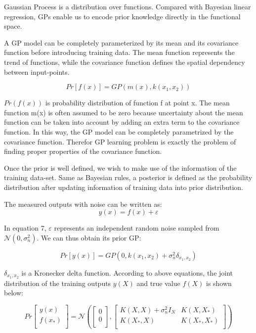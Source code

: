 \documentclass[conference]{IEEEtran}
\begin{document}
Gaussian Process is a distribution over functions. Compared with Bayesian linear regression, GPs enable us to encode prior knowledge directly in the functional space.

A GP model can be completely parameterized by its mean and its covariance function before introducing training data. The mean function represents the trend of functions, while the covariance function defines the spatial dependency between input-points\cite{duvenaud2014automatic}\cite{wilson2014covariance}.

\begin{equation}
  Pr[f(x)] = GP(m(x),k(x_1,x_2))  
\end{equation}

$Pr(f(x))$ is probability distribution of function f at point x. The mean function m(x) is often assumed to be zero because uncertainty about the mean function can be taken into account by adding an extra term to the covariance function. In this way, the GP model can be completely parametrized by the covariance function. Therefor GP learning problem is exactly the problem of finding proper properties of the covariance function.

Once the prior is well defined, we wish to make use of the information of the training data-set. Same as Bayesian rules, a posterior is defined as the probability distribution after updating information of training data into prior distribution.

The measured outputs with noise can be written as:
\begin{equation}
  y(x) = f (x) + \varepsilon
\end{equation}

In equation 7, $\varepsilon$ represents an independent random noise sampled from $\mathcal{N}(0,\sigma_n^2)$. We can thus obtain its prior GP:

\begin{equation}
  Pr[y(x)] = GP(0,k(x_1,x_2)+\sigma_n^2 \delta_{x_1,x_2})  
\end{equation}

$\delta_{x_1,x_2}$ is a Kronecker delta function. According to above equations, the joint distribution of the training outputs $y(X)$ and true value $f(X)$ is shown below:

\begin{equation}
Pr\left[ \begin{array}{ccc}
y(x)\\
f(x_*) \\ 
\end{array} 
\right ]=\mathcal{N} (\left[ \begin{array}{ccc}
0\\
0 \\ 
\end{array} 
\right] ,\left[ \begin{array}{ccc}
K(X,X)+ \sigma_n^2 I_N & K(X,X_*)\\
K(X_*,X)& K(X_*,X_*)\\
\end{array} 
\right ] )
\end{equation}
\end{document}
